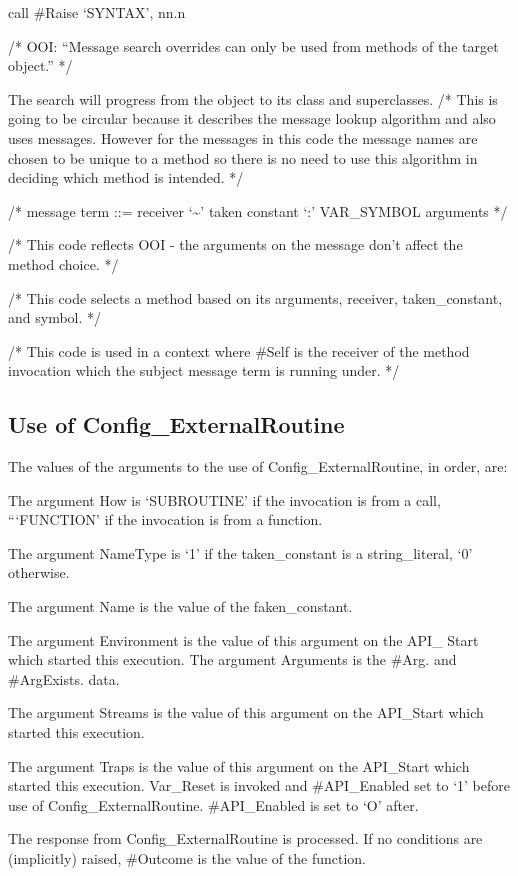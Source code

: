 call \#Raise `SYNTAX', nn.n

/* OOI: ``Message search overrides can only be used from methods of the
target object.'' */

The search will progress from the object to its class and superclasses.
/* This is going to be circular because it describes the message lookup
algorithm and also uses messages. However for the messages in this code
the message names are chosen to be unique to a method so there is no
need to use this algorithm in deciding which method is intended. */

/* message term ::= receiver `\textasciitilde{}' taken constant `:'
VAR\_SYMBOL arguments */

/* This code reflects OOI - the arguments on the message don't affect
the method choice. */

/* This code selects a method based on its arguments, receiver,
taken\_constant, and symbol. */

/* This code is used in a context where \#Self is the receiver of the
method invocation which the subject message term is running under. */


\subsection{Use of
Config\_ExternalRoutine}\label{use-of-config_externalroutine}

The values of the arguments to the use of Config\_ExternalRoutine, in
order, are:

The argument How is `SUBROUTINE' if the invocation is from a call,
```FUNCTION' if the invocation is from a function.

The argument NameType is `1' if the taken\_constant is a
string\_literal, `0' otherwise.

The argument Name is the value of the faken\_constant.

The argument Environment is the value of this argument on the API\_
Start which started this execution. The argument Arguments is the \#Arg.
and \#ArgExists. data.

The argument Streams is the value of this argument on the API\_Start
which started this execution.

The argument Traps is the value of this argument on the API\_Start which
started this execution. Var\_Reset is invoked and \#API\_Enabled set to
`1' before use of Config\_ExternalRoutine. \#API\_Enabled is set to `O'
after.

The response from Config\_ExternalRoutine is processed. If no conditions
are (implicitly) raised, \#Outcome is the value of the function.
